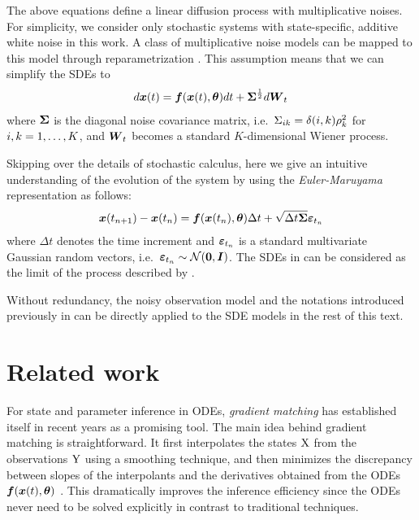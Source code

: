 The above equations define a linear diffusion process with multiplicative noises.
For simplicity, we consider only stochastic systems with state-specific, additive white noise in this work.
A class of multiplicative noise models can be mapped to this model through reparametrization \citep{vrettas2011estimating}.
This assumption means that we can simplify the SDEs to 
\begin{align}
    d\boldsymbol{x}(t) = \boldsymbol{f}(\boldsymbol{x}(t), \boldsymbol{\theta}) dt + \boldsymbol{\Sigma}^{\frac{1}{2}} d\boldsymbol{W}_t
    \label{eq-sdes}
\end{align} 
where $\boldsymbol{\Sigma}$ is the diagonal noise covariance matrix, i.e.\ $\Sigma_{ik} = \delta(i,k)\rho_k^2$ for $i, k = 1,\dots,K$, and $\boldsymbol{W}_t$ becomes a standard $K$-dimensional Wiener process.

Skipping over the details of stochastic calculus, here we give an intuitive understanding of the evolution of the system by using the \emph{Euler-Maruyama} \citep{higham2001algorithmic} representation as follows:
\begin{align}
    \boldsymbol{x}(t_{n+1}) - \boldsymbol{x}(t_{n}) = \boldsymbol{f}(\boldsymbol{x}(t_{n}), \boldsymbol{\theta}) \Delta t + 
    \sqrt{\Delta t \boldsymbol{\Sigma}} \boldsymbol{\varepsilon}_{t_n}
    \label{eq-sdes-euler-maruyama}
\end{align}
where $\Delta t$ denotes the time increment and ${\boldsymbol{\varepsilon}}_{t_n}$ is a standard multivariate Gaussian random vectors, i.e.\ ${\boldsymbol{\varepsilon}}_{t_n} \sim \mathcal{N}(\boldsymbol{0}, \boldsymbol{I})$.
The SDEs in  can be considered as the limit of the process described by  \citep{archambeau2007gaussian}.

Without redundancy, the noisy observation model and the notations introduced previously in  can be directly applied to the SDE models in the rest of this text.

\section{Related work}
\label{sec-related}

For state and parameter inference in ODEs, \emph{gradient matching} has established itself in recent years as a promising tool.
The main idea behind gradient matching is straightforward.
It first interpolates the states $\mathrm{X}$ from the observations $\mathrm{Y}$ using a smoothing technique, and then minimizes the discrepancy between slopes of the interpolants and the derivatives obtained from the ODEs $\boldsymbol{f}(\boldsymbol{x}(t), \boldsymbol{\theta})$ \citep{macdonald2015gradient}.
This dramatically improves the inference efficiency since the ODEs never need to be solved explicitly in contrast to traditional techniques.

